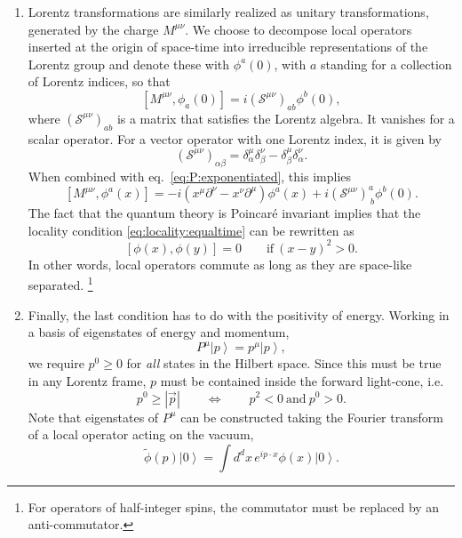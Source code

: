 \documentclass[a4paper,12pt]{article}
\newcommand{\ket}[1]{\left| #1 \right\rangle}
\numberwithin{equation}{section}
\begin{document}
\begin{enumerate}
\item
Lorentz transformations are similarly realized as unitary transformations, generated by the charge $M^{\mu\nu}$.
We choose to decompose local operators inserted at the origin of space-time into irreducible representations of the Lorentz group and denote these with $\phi^a(0)$, with $a$ standing for a collection of Lorentz indices, so that
\begin{equation}
	\left[ M^{\mu\nu}, \phi_a(0) \right]
	= i \left( \mathcal{S}^{\mu\nu} \right)_{ab} \phi^b(0),
\end{equation}
where $\left( \mathcal{S}^{\mu\nu} \right)_{ab}$ is a matrix that satisfies the Lorentz algebra. It vanishes for a scalar operator. For a vector operator with one Lorentz index, it is given by
\begin{equation}
	\left( \mathcal{S}^{\mu\nu} \right)_{\alpha\beta}
	= \delta^\mu_\alpha \delta^\nu_\beta
	- \delta^\mu_\beta \delta^\nu_\alpha.
	\label{eq:spinop:vector}
\end{equation}
When combined with eq.~\eqref{eq:P:exponentiated}, this implies
\begin{equation}
	\left[ M^{\mu\nu}, \phi^a(x) \right] = 
	-i \left( x^\mu \partial^\nu - x^\nu \partial^\mu \right) \phi^a(x)
	+ i \left( \mathcal{S}^{\mu\nu} \right)^a_{~b} \phi^b(0).
	\label{eq:commutator:M}
\end{equation}
The fact that the quantum theory is Poincaré invariant implies that the locality condition \eqref{eq:locality:equaltime} can be rewritten as
\begin{equation}
	\left[ \phi(x), \phi(y) \right] = 0
	\qquad
	\text{if}~(x-y)^2 > 0.
	\label{eq:causality}
\end{equation}
In other words, local operators commute as long as they are space-like separated.%
%
\footnote{For operators of half-integer spins, the commutator must be replaced by an anti-commutator.} 
%

\item
Finally, the last condition has to do with the positivity of energy.
Working in a basis of eigenstates of energy and momentum, 
\begin{equation}
	P^\mu \ket{p} = p^\mu \ket{p},
\end{equation}
we require $p^0 \geq 0$ for \emph{all} states in the Hilbert space. Since this must be true in any Lorentz frame, $p$ must be contained inside the forward light-cone, i.e.
\begin{equation}
	p^0 \geq \left| \vec{p} \right|
	\qquad \Leftrightarrow \qquad
	p^2 < 0 ~\text{and}~ p^0 > 0.
	\label{eq:forwardcone}
\end{equation}
Note that eigenstates of $P^\mu$ can be constructed taking the Fourier transform of a local operator acting on the vacuum,
\begin{equation}
	\widetilde{\phi}(p) \ket{0}
	= \int d^dx \, e^{i p \cdot x} \phi(x) \ket{0}.
	\label{eq:momentumspace:state}
\end{equation}

\end{enumerate}
\end{document}
